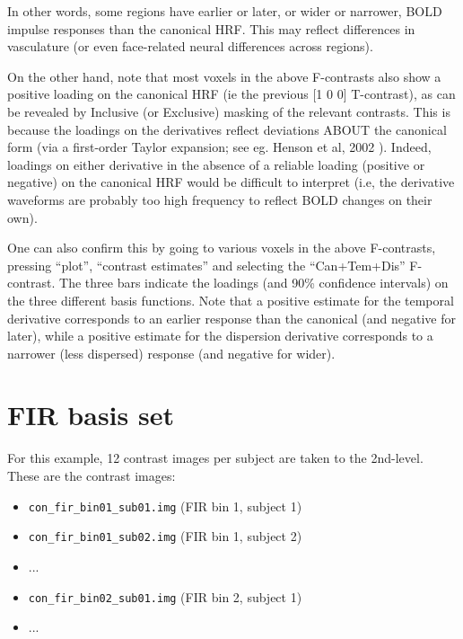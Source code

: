 In other words, some regions have earlier or later, or wider or narrower, BOLD impulse responses than the canonical HRF. This may reflect differences in vasculature (or even face-related neural differences across regions).  

On the other hand, note that most voxels in the above F-contrasts also show a positive loading on the canonical HRF (ie the previous [1 0 0] T-contrast), as can be revealed by Inclusive (or Exclusive) masking of the relevant contrasts. This is because the loadings on the derivatives reflect deviations ABOUT the canonical form (via a first-order Taylor expansion; see eg. Henson et al, 2002 \cite{rnah_latency}). Indeed, loadings on either derivative in the absence of a reliable loading (positive or negative) on the canonical HRF would be difficult to interpret (i.e, the derivative waveforms are probably too high frequency to reflect BOLD changes on their own).   

One can also confirm this by going to various voxels in the above F-contrasts, pressing ``plot'', ``contrast estimates'' and selecting the ``Can+Tem+Dis'' F-contrast. The three bars indicate the loadings (and 90\% confidence intervals) on the three different basis functions. Note that a positive estimate for the temporal derivative corresponds to an earlier response than the canonical (and negative for later), while a positive estimate for the dispersion derivative corresponds to a narrower (less dispersed) response (and negative for wider).

\section{FIR basis set}

For this example, 12 contrast images per subject are taken to the 2nd-level. These are the contrast images:

\begin{itemize}
\item \texttt{con\_fir\_bin01\_sub01.img}    (FIR bin 1, subject 1)
\item \texttt{con\_fir\_bin01\_sub02.img}    (FIR bin 1, subject 2)
\item ...
\item \texttt{con\_fir\_bin02\_sub01.img}    (FIR bin 2, subject 1)
\item ...
\end{itemize}


